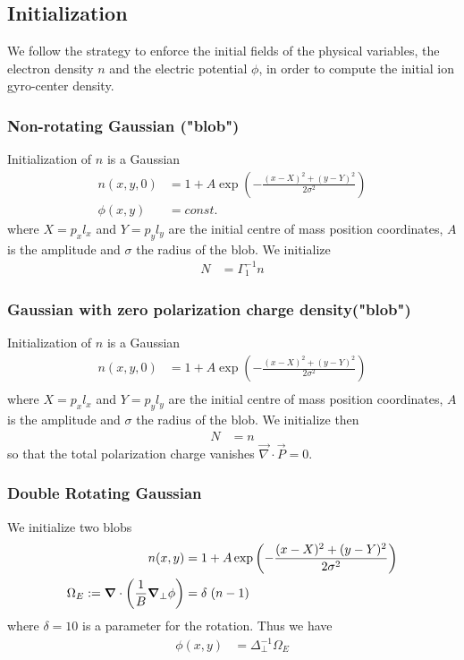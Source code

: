 \subsection{Initialization}
We follow the strategy to enforce the initial fields of the physical variables, the electron density \(n\) and the electric potential \(\phi\), in order to compute the initial ion gyro-center density.
\subsubsection{Non-rotating Gaussian ("blob")}
Initialization of $n$ is a Gaussian 
\begin{align}
    n(x,y,0) &= 1 + A\exp\left( -\frac{(x-X)^2 + (y-Y)^2}{2\sigma^2}\right) \\
    \phi(x,y)&=const.
\end{align}
where $X = p_x l_x$ and $Y=p_yl_y$ are the initial centre of mass position coordinates, $A$ is the amplitude and $\sigma$ the
radius of the blob.
We initialize 
\begin{align}
    N &= \Gamma_1^{-1} n 
\end{align}
\subsubsection{Gaussian with zero polarization charge density("blob")}
Initialization of $n$ is a Gaussian 
\begin{align}
    n(x,y,0) &= 1 + A\exp\left( -\frac{(x-X)^2 + (y-Y)^2}{2\sigma^2}\right) \\
\end{align}
where $X = p_x l_x$ and $Y=p_yl_y$ are the initial centre of mass position coordinates, $A$ is the amplitude and $\sigma$ the radius of the blob. We initialize then
\begin{align}
    N &= n 
\end{align}
so that the total polarization charge vanishes  \(\vec{\nabla}\cdot \vec{P}=0\).

\subsubsection{Double Rotating Gaussian }
We initialize two blobs
\begin{align}
    n(x,y) &= 1 + A\exp\left( -\frac{(x-X)^2 + (y-Y)^2}{2\sigma^2}\right) \\
    \Omega_E:= \vec{\nabla} \cdot \left(\frac{1}{B} \vec{\nabla}_\perp \phi\right) &= \delta \hspace{1mm} (n-1)
\end{align}
where \(\delta = 10\) is a parameter for the rotation.
Thus we have
\begin{align}
  \phi(x,y) &= \Delta_\perp^{-1} \Omega_E 
\end{align}

